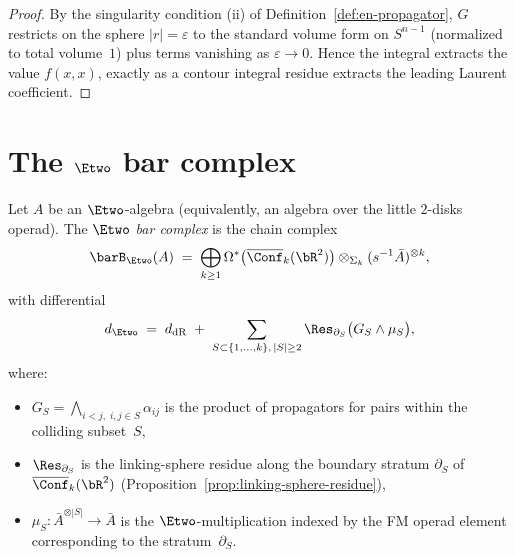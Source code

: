 \begin{proof}
By the singularity condition (ii) of
Definition~\ref{def:en-propagator}, $G$ restricts on the
sphere $|r| = \varepsilon$ to the standard volume form on $S^{n-1}$
(normalized to total volume~$1$) plus terms vanishing as
$\varepsilon \to 0$. Hence the integral extracts the value
$f(x, x)$, exactly as a contour integral residue extracts the
leading Laurent coefficient.
\end{proof}



\section{\texorpdfstring{The $\Etwo$ bar complex}{The E2 bar complex}}
\label{sec:e2-bar}

\begin{definition}
\label{def:e2-bar-complex}
Let $A$ be an $\Etwo$-algebra (equivalently, an algebra over
the little $2$-disks operad). The \emph{$\Etwo$ bar complex}
is the chain complex
\[
\barB_{\Etwo}(A)
\;=\;
\bigoplus_{k \geq 1}
\Omega^*\bigl(\overline{\Conf}_k(\bR^2)\bigr)
\otimes_{\Sigma_k} (s^{-1} \bar{A})^{\otimes k},
\]
with differential
\begin{equation}\label{eq:e2-bar-diff}
d_{\Etwo}
\;=\;
d_{\mathrm{dR}}
\;+\;
\sum_{S \subset \{1, \ldots, k\},\, |S| \geq 2}
\Res_{\partial_S}\bigl(G_S \wedge \mu_S\bigr),
\end{equation}
where:
\begin{itemize}
\item $G_S = \bigwedge_{i < j,\; i, j \in S} \alpha_{ij}$ is the
 product of propagators for pairs within the
 colliding subset~$S$,
\item $\Res_{\partial_S}$ is the linking-sphere residue along the
 boundary stratum $\partial_S$ of
 $\overline{\Conf}_k(\bR^2)$
 \textup{(}Proposition~\textup{\ref{prop:linking-sphere-residue})},
\item $\mu_S\colon \bar{A}^{\otimes |S|} \to \bar{A}$ is the
 $\Etwo$-multiplication indexed by the FM operad element
 corresponding to the stratum~$\partial_S$.
\end{itemize}
\end{definition}

